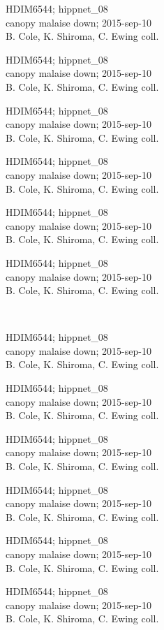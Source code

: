 \documentclass[2pt]{extarticle}
\begin{document}
\noindent
\parbox{0.16\textwidth}{\tiny \raggedright \rule[-0.3\baselineskip]{0pt}{10pt}HDIM6544; hippnet\_08\\ canopy malaise down; 2015-sep-10\\ B. Cole, K. Shiroma, C. Ewing coll.}
\parbox{0.16\textwidth}{\tiny \raggedright \rule[-0.3\baselineskip]{0pt}{10pt}HDIM6544; hippnet\_08\\ canopy malaise down; 2015-sep-10\\ B. Cole, K. Shiroma, C. Ewing coll.}
\parbox{0.16\textwidth}{\tiny \raggedright \rule[-0.3\baselineskip]{0pt}{10pt}HDIM6544; hippnet\_08\\ canopy malaise down; 2015-sep-10\\ B. Cole, K. Shiroma, C. Ewing coll.}
\parbox{0.16\textwidth}{\tiny \raggedright \rule[-0.3\baselineskip]{0pt}{10pt}HDIM6544; hippnet\_08\\ canopy malaise down; 2015-sep-10\\ B. Cole, K. Shiroma, C. Ewing coll.}
\parbox{0.16\textwidth}{\tiny \raggedright \rule[-0.3\baselineskip]{0pt}{10pt}HDIM6544; hippnet\_08\\ canopy malaise down; 2015-sep-10\\ B. Cole, K. Shiroma, C. Ewing coll.}
\parbox{0.16\textwidth}{\tiny \raggedright \rule[-0.3\baselineskip]{0pt}{10pt}HDIM6544; hippnet\_08\\ canopy malaise down; 2015-sep-10\\ B. Cole, K. Shiroma, C. Ewing coll.} \\ 
\vspace{0.001in} 

\noindent
\parbox{0.16\textwidth}{\tiny \raggedright \rule[-0.3\baselineskip]{0pt}{10pt}HDIM6544; hippnet\_08\\ canopy malaise down; 2015-sep-10\\ B. Cole, K. Shiroma, C. Ewing coll.}
\parbox{0.16\textwidth}{\tiny \raggedright \rule[-0.3\baselineskip]{0pt}{10pt}HDIM6544; hippnet\_08\\ canopy malaise down; 2015-sep-10\\ B. Cole, K. Shiroma, C. Ewing coll.}
\parbox{0.16\textwidth}{\tiny \raggedright \rule[-0.3\baselineskip]{0pt}{10pt}HDIM6544; hippnet\_08\\ canopy malaise down; 2015-sep-10\\ B. Cole, K. Shiroma, C. Ewing coll.}
\parbox{0.16\textwidth}{\tiny \raggedright \rule[-0.3\baselineskip]{0pt}{10pt}HDIM6544; hippnet\_08\\ canopy malaise down; 2015-sep-10\\ B. Cole, K. Shiroma, C. Ewing coll.}
\parbox{0.16\textwidth}{\tiny \raggedright \rule[-0.3\baselineskip]{0pt}{10pt}HDIM6544; hippnet\_08\\ canopy malaise down; 2015-sep-10\\ B. Cole, K. Shiroma, C. Ewing coll.}
\parbox{0.16\textwidth}{\tiny \raggedright \rule[-0.3\baselineskip]{0pt}{10pt}HDIM6544; hippnet\_08\\ canopy malaise down; 2015-sep-10\\ B. Cole, K. Shiroma, C. Ewing coll.} \\ 
\vspace{0.001in} 
\end{document}
